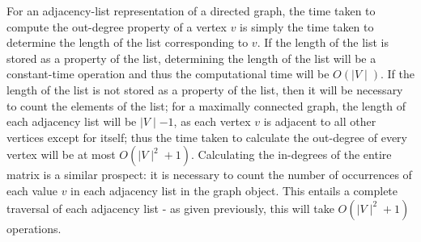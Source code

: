 For an adjacency-list representation of a directed graph, the time taken to compute the out-degree property of a vertex $ v $ is simply the time taken to determine the length of the list corresponding to $ v $. If the length of the list is stored as a property of the list, determining the length of the list will be a constant-time operation and thus the computational time will be $ O ( \mid V \mid ) $. If the length of the list is not stored as a property of the list, then it will be necessary to count the elements of the list; for a maximally connected graph, the length of each adjacency list will be $ \mid V \mid - 1 $, as each vertex $ v $ is adjacent to all other vertices except for itself; thus the time taken to calculate the out-degree of every vertex will be at most $ O ( \mid V \mid^2 + 1) $. Calculating the in-degrees of the entire matrix is a similar prospect: it is necessary to count the number of occurrences of each value $ v $ in each adjacency list in the graph object. This entails a complete traversal of each adjacency list - as given previously, this will take $ O ( \mid V \mid^2 + 1) $ operations.